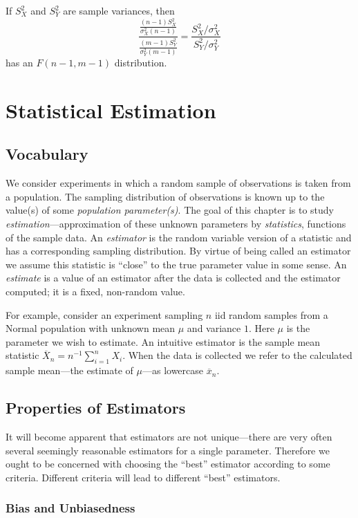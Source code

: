 \documentclass[]{book}
\begin{document}
If \(S_X^2\) and \(S_Y^2\) are sample variances, then
\[\frac{\frac{(n-1)S_X^2}{\sigma_X^2(n-1)}}{\frac{(m-1)S_Y^2}{\sigma_Y^2(m-1)}} = \frac{S_X^2/\sigma_X^2}{S_Y^2/\sigma_Y^2}\]
has an \(F(n-1, m-1)\) distribution.

\chapter{Statistical Estimation}\label{statistical-estimation}

\section{Vocabulary}\label{vocabulary}

We consider experiments in which a random sample of observations is
taken from a population. The sampling distribution of observations is
known up to the value(s) of some \emph{population parameter(s)}. The
goal of this chapter is to study \emph{estimation}---approximation of
these unknown parameters by \emph{statistics}, functions of the sample
data. An \emph{estimator} is the random variable version of a statistic
and has a corresponding sampling distribution. By virtue of being called
an estimator we assume this statistic is ``close'' to the true parameter
value in some sense. An \emph{estimate} is a value of an estimator after
the data is collected and the estimator computed; it is a fixed,
non-random value.

For example, consider an experiment sampling \(n\) iid random samples
from a Normal population with unknown mean \(\mu\) and variance \(1\).
Here \(\mu\) is the parameter we wish to estimate. An intuitive
estimator is the sample mean statistic
\(\overline X_n = n^{-1}\sum_{i=1}^n X_i\). When the data is collected
we refer to the calculated sample mean---the estimate of \(\mu\)---as
lowercase \(\overline x_n\).

\section{Properties of Estimators}\label{properties-of-estimators}

It will become apparent that estimators are not unique---there are very
often several seemingly reasonable estimators for a single parameter.
Therefore we ought to be concerned with choosing the ``best'' estimator
according to some criteria. Different criteria will lead to different
``best'' estimators.

\subsection{Bias and Unbiasedness}\label{bias-and-unbiasedness}
\end{document}
